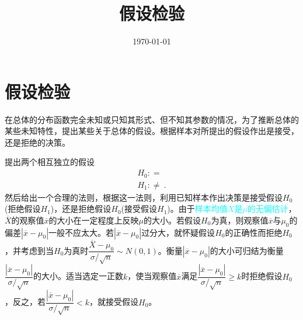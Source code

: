\documentclass[12pt,a4paper]{article}
\title{假设检验}
\author{}
\date{\today}
\begin{document}
\maketitle

\section{假设检验}
\cite{浙大概率论与数理统计} 在总体的分布函数完全未知或只知其形式、但不知其参数的情况，为了推断总体的某些未知特性，提出某些关于总体的假设。根据样本对所提出的假设作出是接受，还是拒绝的决策。


提出两个相互独立的假设
\begin{eqnarray*}
H_0 :  = \\
H_1 :  \neq ~.
\end{eqnarray*}
然后给出一个合理的法则，根据这一法则，利用已知样本作出决策是接受假设$H_0$(拒绝假设$H_1$)，还是拒绝假设$H_0$(接受假设$H_1$)。由于\textcolor{cyan}{样本均值$\overline{X}$是$\mu$的无偏估计}，$\overline{X}$的观察值$\overline{x}$的大小在一定程度上反映$\mu$的大小。若假设$H_0$为真，则观察值$\overline{x}$与$\mu_0$的偏差$|\overline{x}-\mu_0|$一般不应太大。若$|\overline{x}-\mu_0|$过分大，就怀疑假设$H_0$的正确性而拒绝$H_0$，并考虑到当$H_0$为真时$\dfrac{\overline{X}-\mu_0}{\sigma/\sqrt{n}} \sim N(0,1)$。衡量$|\overline{x}-\mu_0|$的大小可归结为衡量$\dfrac{|\overline{x}-\mu_0|}{\sigma/\sqrt{n}}$的大小。适当选定一正数$k$，使当观察值$\overline{x}$满足$\dfrac{|\overline{x}-\mu_0|}{\sigma/\sqrt{n}} \geqslant k$时拒绝假设$H_0$，反之，若$\dfrac{|\overline{x}-\mu_0|}{\sigma/\sqrt{n}} < k$，就接受假设$H_0$。
\end{document}
